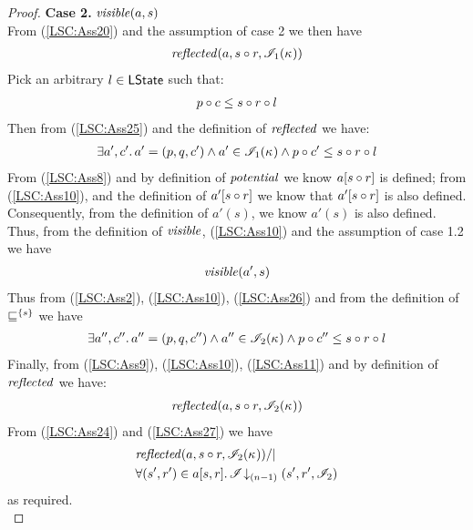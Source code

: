 \begin{lemma}
\begin{proof}
\noindent\textbf{Case 2. } $\mathit{visible}(a, s)$\\
From (\ref{LSC:Ass20}) and the assumption of case 2 we then have
%
\begin{align}
	\mathit{reflected}(a, s \circ r, \mathscr{I}_1(\kappa_{}))
	\label{LSC:Ass25}
\end{align}
%
Pick an arbitrary $l \in \textsf{LState}$ such that:
%
\begin{align}
	p \circ c \leq s \circ r \circ l \label{LSC:Ass9}
\end{align}
%
Then from (\ref{LSC:Ass25}) and the definition of $\mathit{reflected}$ we have:
\begin{align}
	\exists a', c'.\, a' = (p, q, c') \land a' \in \mathscr{I}_1(\kappa_{}) \land  p \circ c' \leq s \circ r \circ l \label{LSC:Ass10}
\end{align}
From (\ref{LSC:Ass8}) and by definition of $\mathit{potential}$ we know $a[s \circ r]$ is defined; from (\ref{LSC:Ass10}), and the definition of $a'[s \circ r]$ we know that $a'[s \circ r]$ is also defined. Consequently, from the definition of $a'(s)$, we know $a'(s)$ is also defined. Thus, from the definition of $\mathit{visible}$, (\ref{LSC:Ass10}) and the assumption of case 1.2 we have 
%
\begin{align}
	\mathit{visible}(a', s)
	\label{LSC:Ass26}
\end{align}
%
Thus from (\ref{LSC:Ass2}), (\ref{LSC:Ass10}), (\ref{LSC:Ass26}) and from the definition of $\sqsubseteq^{\{s\}}$ we have 
%
\begin{align}
	\exists a'', c''.\, a'' = (p, q, c'') \land a'' \in \mathscr{I}_2(\kappa_{}) \land  p \circ c'' \leq s \circ r \circ l  \label{LSC:Ass11}
\end{align} 
%
Finally, from (\ref{LSC:Ass9}), (\ref{LSC:Ass10}), (\ref{LSC:Ass11}) and by definition of $\mathit{reflected}$ we have:
%
\begin{align}
	\mathit{reflected}(a, s \circ r, \mathscr{I}_2(\kappa_{}))
	\label{LSC:Ass27}
\end{align} 
%
From (\ref{LSC:Ass24}) and (\ref{LSC:Ass27}) we have
\begin{align*}
	&\mathit{reflected}(a, s \circ r, \mathscr{I}_2(\kappa_{})) /| \\
	&\forall (s', r') \in a[s, r].\, \mathscr{I} \!\downarrow_{(n-1)} \left(s', r', \mathscr{I}_2\right)
\end{align*}
%
as required.\\
%
%
%
%

\end{proof}
\end{lemma}
%
%
%
%
%
%

